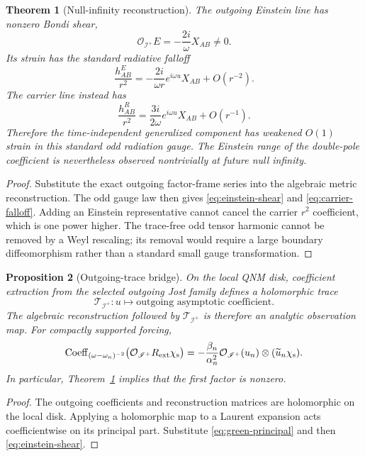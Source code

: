 \documentclass[11pt]{article}
\newtheorem{theorem}{Theorem}[section]
\newtheorem{proposition}[theorem]{Proposition}
\theoremstyle{remark}
\begin{document}
\begin{theorem}[Null-infinity reconstruction]
\label{thm:null-infinity}
The outgoing Einstein line has nonzero Bondi shear,
\begin{equation}\label{eq:einstein-shear}
 \boxed{\;
 \mathcal O_{\mathscr I^+}E
 =-\frac{2i}{\omega}X_{AB}\ne0.
 \;}
\end{equation}
Its strain has the standard radiative falloff
\[
 \frac{h^E_{AB}}{r^2}
 =-\frac{2i}{\omega r}e^{i\omega u}X_{AB}
 +O(r^{-2}).
\]
The carrier line instead has
\begin{equation}\label{eq:carrier-falloff}
 \boxed{\;
 \frac{h^R_{AB}}{r^2}
 =\frac{3i}{2\omega}e^{i\omega u}X_{AB}
 +O(r^{-1}).
 \;}
\end{equation}
Therefore the time-independent generalized component has weakened
\(O(1)\) strain in this standard odd radiation gauge.  The Einstein
range of the double-pole coefficient is nevertheless observed
nontrivially at future null infinity.
\end{theorem}

\begin{proof}
Substitute the exact outgoing factor-frame series into the algebraic
metric reconstruction.  The odd gauge law then gives
\eqref{eq:einstein-shear} and \eqref{eq:carrier-falloff}.  Adding an
Einstein representative cannot cancel the carrier \(r^2\) coefficient,
which is one power higher.  The trace-free odd tensor harmonic cannot be
removed by a Weyl rescaling; its removal would require a large boundary
diffeomorphism rather than a standard small gauge transformation.
\end{proof}

\begin{proposition}[Outgoing-trace bridge]\label{prop:bondi-trace}
On the local QNM disk, coefficient extraction from the selected outgoing
Jost family defines a holomorphic trace
\[
 \mathcal T_{\mathscr I^+}:u\longmapsto
 \text{outgoing asymptotic coefficient}.
\]
The algebraic reconstruction followed by
\(\mathcal T_{\mathscr I^+}\) is therefore an analytic observation map.
For compactly supported forcing,
\[
 \operatorname{Coeff}_{(\omega-\omega_n)^{-2}}
 \bigl(\mathcal O_{\mathscr I^+}R_{\rm ext}\chi_{\rm s}\bigr)
 =
 -\frac{\beta_n}{\alpha_n^2}
 \mathcal O_{\mathscr I^+}(u_n)
 \otimes(\widetilde u_n\chi_{\rm s}).
\]
In particular, Theorem~\ref{thm:null-infinity} implies that the first
factor is nonzero.
\end{proposition}

\begin{proof}
The outgoing coefficients and reconstruction matrices are holomorphic on
the local disk.  Applying a holomorphic map to a Laurent expansion acts
coefficientwise on its principal part.  Substitute
\eqref{eq:green-principal} and then
\eqref{eq:einstein-shear}.
\end{proof}
\end{document}
